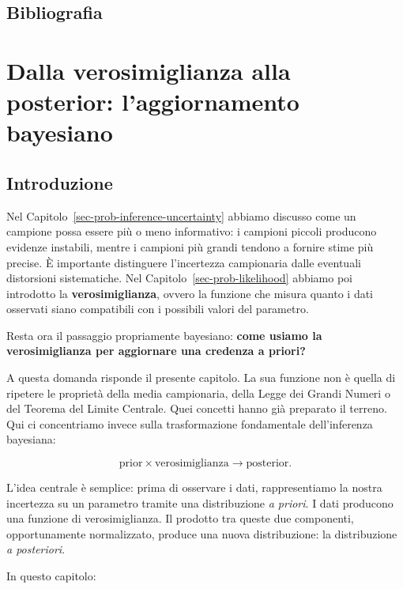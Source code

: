 \documentclass[
  italian,
  letterpaper,
  a4paper,
  11pt,
  open=any]{scrbook}
\theoremstyle{plain}
\theoremstyle{definition}
\theoremstyle{definition}
\theoremstyle{remark}
\begin{document}
\section*{Bibliografia}\label{bibliografia-8}


\chapter{Dalla verosimiglianza alla posterior: l'aggiornamento
bayesiano}\label{sec-bayesian-updating}

\section*{Introduzione}\label{introduzione-14}


Nel Capitolo~\ref{sec-prob-inference-uncertainty} abbiamo discusso come
un campione possa essere più o meno informativo: i campioni piccoli
producono evidenze instabili, mentre i campioni più grandi tendono a
fornire stime più precise. È importante distinguere l'incertezza
campionaria dalle eventuali distorsioni sistematiche. Nel
Capitolo~\ref{sec-prob-likelihood} abbiamo poi introdotto la
\textbf{verosimiglianza}, ovvero la funzione che misura quanto i dati
osservati siano compatibili con i possibili valori del parametro.

Resta ora il passaggio propriamente bayesiano: \textbf{come usiamo la
verosimiglianza per aggiornare una credenza a priori?}

A questa domanda risponde il presente capitolo. La sua funzione non è
quella di ripetere le proprietà della media campionaria, della Legge dei
Grandi Numeri o del Teorema del Limite Centrale. Quei concetti hanno già
preparato il terreno. Qui ci concentriamo invece sulla trasformazione
fondamentale dell'inferenza bayesiana:

\[
\text{prior} \times \text{verosimiglianza} \longrightarrow \text{posterior}.
\]

L'idea centrale è semplice: prima di osservare i dati, rappresentiamo la
nostra incertezza su un parametro tramite una distribuzione \emph{a
priori}. I dati producono una funzione di verosimiglianza. Il prodotto
tra queste due componenti, opportunamente normalizzato, produce una
nuova distribuzione: la distribuzione \emph{a posteriori}.

In questo capitolo:
\end{document}
